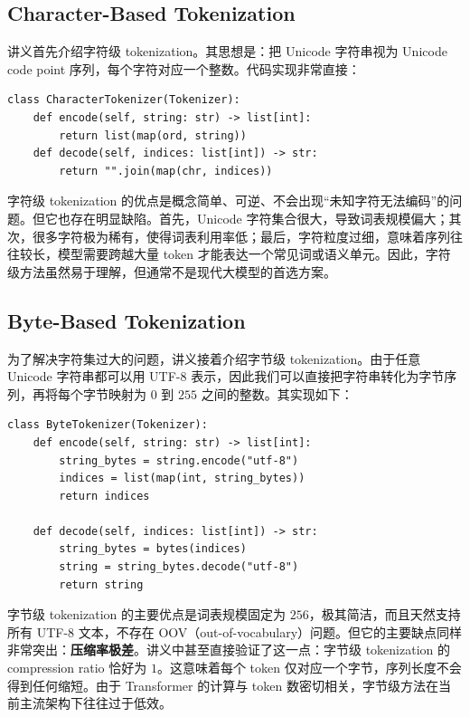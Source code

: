 \documentclass[a4paper,UTF8]{article}
\numberwithin{equation}{section}
\begin{document}
\subsection{Character-Based Tokenization}

讲义首先介绍字符级 tokenization。其思想是：把 Unicode 字符串视为 Unicode code point 序列，每个字符对应一个整数。代码实现非常直接：

\begin{verbatim}
class CharacterTokenizer(Tokenizer):
    def encode(self, string: str) -> list[int]:
        return list(map(ord, string))
    def decode(self, indices: list[int]) -> str:
        return "".join(map(chr, indices))
\end{verbatim}

字符级 tokenization 的优点是概念简单、可逆、不会出现“未知字符无法编码”的问题。但它也存在明显缺陷。首先，Unicode 字符集合很大，导致词表规模偏大；其次，很多字符极为稀有，使得词表利用率低；最后，字符粒度过细，意味着序列往往较长，模型需要跨越大量 token 才能表达一个常见词或语义单元。因此，字符级方法虽然易于理解，但通常不是现代大模型的首选方案。

\subsection{Byte-Based Tokenization}

为了解决字符集过大的问题，讲义接着介绍字节级 tokenization。由于任意 Unicode 字符串都可以用 UTF-8 表示，因此我们可以直接把字符串转化为字节序列，再将每个字节映射为 $0$ 到 $255$ 之间的整数。其实现如下：

\begin{verbatim}
class ByteTokenizer(Tokenizer):
    def encode(self, string: str) -> list[int]:
        string_bytes = string.encode("utf-8")
        indices = list(map(int, string_bytes))
        return indices

    def decode(self, indices: list[int]) -> str:
        string_bytes = bytes(indices)
        string = string_bytes.decode("utf-8")
        return string
\end{verbatim}

字节级 tokenization 的主要优点是词表规模固定为 $256$，极其简洁，而且天然支持所有 UTF-8 文本，不存在 OOV（out-of-vocabulary）问题。但它的主要缺点同样非常突出：\textbf{压缩率极差}。讲义中甚至直接验证了这一点：字节级 tokenization 的 compression ratio 恰好为 $1$。这意味着每个 token 仅对应一个字节，序列长度不会得到任何缩短。由于 Transformer 的计算与 token 数密切相关，字节级方法在当前主流架构下往往过于低效。
\end{document}
